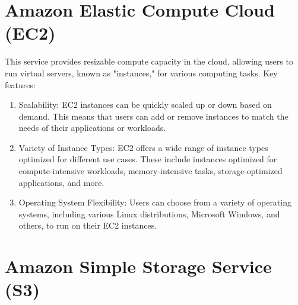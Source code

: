 \documentclass[11pt,a4paper,oneside]{report}
\begin{document}
\section{Amazon Elastic Compute Cloud (EC2)}

This service provides resizable compute capacity in the cloud, allowing users to run virtual servers, known as "instances," for various computing tasks.
Key features:
\begin{enumerate}
  \item Scalability: EC2 instances can be quickly scaled up or down based on demand. This means that users can add or remove instances to match the needs of their applications or workloads.
  \item Variety of Instance Types: EC2 offers a wide range of instance types optimized for different use cases. These include instances optimized for compute-intensive workloads, memory-intensive tasks, storage-optimized applications, and more.
  \item Operating System Flexibility: Users can choose from a variety of operating systems, including various Linux distributions, Microsoft Windows, and others, to run on their EC2 instances. \cite{awsec2}
\end{enumerate}
\section{Amazon Simple Storage Service (S3)}
\end{document}
